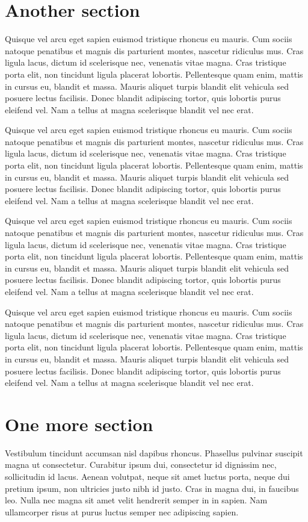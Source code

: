 \documentclass[twoside]{article}
\begin{document}
\begin{multicols}{2}
\section{Another section}
Quisque vel arcu eget sapien euismod tristique rhoncus eu mauris. Cum sociis natoque penatibus et magnis dis parturient montes, nascetur ridiculus mus. Cras ligula lacus, dictum id scelerisque nec, venenatis vitae magna. Cras tristique porta elit, non tincidunt ligula placerat lobortis. Pellentesque quam enim, mattis in cursus eu, blandit et massa. Mauris aliquet turpis blandit elit vehicula sed posuere lectus facilisis. Donec blandit adipiscing tortor, quis lobortis purus eleifend vel. Nam a tellus at magna scelerisque blandit vel nec erat.

Quisque vel arcu eget sapien euismod tristique rhoncus eu mauris. Cum sociis natoque penatibus et magnis dis parturient montes, nascetur ridiculus mus. Cras ligula lacus, dictum id scelerisque nec, venenatis vitae magna. Cras tristique porta elit, non tincidunt ligula placerat lobortis. Pellentesque quam enim, mattis in cursus eu, blandit et massa. Mauris aliquet turpis blandit elit vehicula sed posuere lectus facilisis. Donec blandit adipiscing tortor, quis lobortis purus eleifend vel. Nam a tellus at magna scelerisque blandit vel nec erat.

Quisque vel arcu eget sapien euismod tristique rhoncus eu mauris. Cum sociis natoque penatibus et magnis dis parturient montes, nascetur ridiculus mus. Cras ligula lacus, dictum id scelerisque nec, venenatis vitae magna. Cras tristique porta elit, non tincidunt ligula placerat lobortis. Pellentesque quam enim, mattis in cursus eu, blandit et massa. Mauris aliquet turpis blandit elit vehicula sed posuere lectus facilisis. Donec blandit adipiscing tortor, quis lobortis purus eleifend vel. Nam a tellus at magna scelerisque blandit vel nec erat.

Quisque vel arcu eget sapien euismod tristique rhoncus eu mauris. Cum sociis natoque penatibus et magnis dis parturient montes, nascetur ridiculus mus. Cras ligula lacus, dictum id scelerisque nec, venenatis vitae magna. Cras tristique porta elit, non tincidunt ligula placerat lobortis. Pellentesque quam enim, mattis in cursus eu, blandit et massa. Mauris aliquet turpis blandit elit vehicula sed posuere lectus facilisis. Donec blandit adipiscing tortor, quis lobortis purus eleifend vel. Nam a tellus at magna scelerisque blandit vel nec erat.

\section{One more section}
Vestibulum tincidunt accumsan nisl dapibus rhoncus. Phasellus pulvinar suscipit magna ut consectetur. Curabitur ipsum dui, consectetur id dignissim nec, sollicitudin id lacus. Aenean volutpat, neque sit amet luctus porta, neque dui pretium ipsum, non ultricies justo nibh id justo. Cras in magna dui, in faucibus leo. Nulla nec magna sit amet velit hendrerit semper in in sapien. Nam ullamcorper risus at purus luctus semper nec adipiscing sapien.

\end{multicols}
\end{document}
